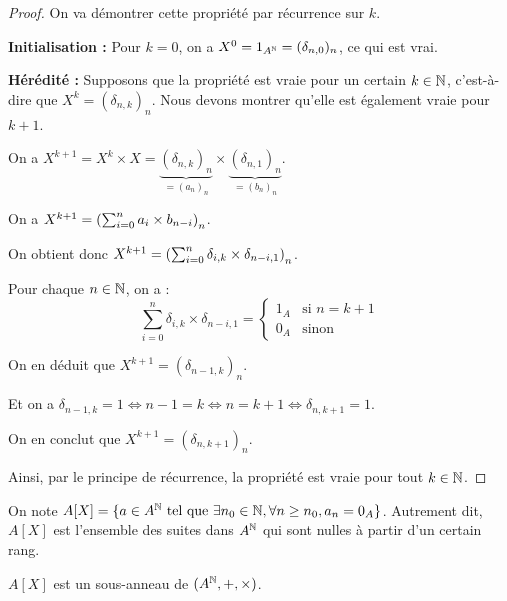 \documentclass[12pt, a4paper]{report}
\begin{document}
\begin{proof}
    On va démontrer cette propriété par récurrence sur $k$.

    \textbf{Initialisation :} Pour $k=0$, on a $X^0 = 1_{A^{\mathbb{N}}} = (\delta_{n,0})_n$, ce qui est vrai.

    \textbf{Hérédité :} Supposons que la propriété est vraie pour un certain $k \in \mathbb{N}$, c'est-à-dire que $X^k = (\delta_{n,k})_n$. Nous devons montrer qu'elle est également vraie pour $k+1$.

    On a $X^{k+1} = X^k \times X = \underbrace{(\delta_{n,k})_n}_{=(a_n)_n} \times \underbrace{(\delta_{n,1})_n}_{=(b_n)_n}$.

    On a $X^{k+1} = \left(\sum_{i=0}^{n}a_i\times b_{n-i}\right)_n$.

    On obtient donc $X^{k+1} = \left(\sum_{i=0}^{n}\delta_{i,k}\times \delta_{n-i,1}\right)_n$.

    Pour chaque $n \in \mathbb{N}$, on a :
    \[\sum_{i=0}^{n}\delta_{i,k}\times \delta_{n-i,1} = \begin{cases}
    1_A & \text{si } n = k+1\\
    0_A & \text{sinon}
    \end{cases}\]

    On en déduit que $X^{k+1} = (\delta_{n-1,k})_n$.

    Et on a $\delta_{n-1,k} = 1 \iff n-1 = k \iff n = k+1 \iff \delta_{n,k+1} = 1$.

    On en conclut que $X^{k+1} = (\delta_{n,k+1})_n$.

    Ainsi, par le principe de récurrence, la propriété est vraie pour tout $k \in \mathbb{N}$.
\end{proof}

\begin{definition}
    On note $A[X] = \{a \in A^{\mathbb{N}} \text{ tel que } \exists n_0 \in \mathbb{N}, \forall n \ge n_0, a_n = 0_A\}$. Autrement dit, $A[X]$ est l'ensemble des suites dans $A^{\mathbb{N}}$ qui sont nulles à partir d'un certain rang.
\end{definition}

\begin{property}
    $A[X]$ est un sous-anneau de $(A^{\mathbb{N}}, +, \times)$.
\end{property}
\end{document}

